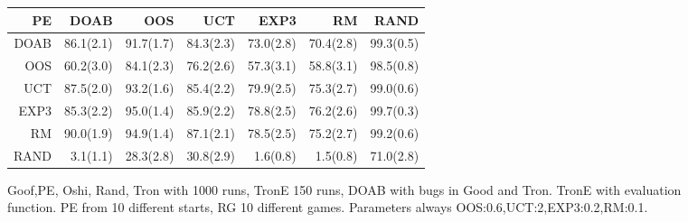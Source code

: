 \begin{figure}
\begin{footnotesize}

\begin{tabular}{|r|rrrrrr|}\hline
PE&DOAB&OOS&UCT&EXP3&RM&RAND\\\hline
DOAB&86.1(2.1)&91.7(1.7)&84.3(2.3)&73.0(2.8)&70.4(2.8)&99.3(0.5)\\
OOS&60.2(3.0)&84.1(2.3)&76.2(2.6)&57.3(3.1)&58.8(3.1)&98.5(0.8)\\
UCT&87.5(2.0)&93.2(1.6)&85.4(2.2)&79.9(2.5)&75.3(2.7)&99.0(0.6)\\
EXP3&85.3(2.2)&95.0(1.4)&85.9(2.2)&78.8(2.5)&76.2(2.6)&99.7(0.3)\\
RM&90.0(1.9)&94.9(1.4)&87.1(2.1)&78.5(2.5)&75.2(2.7)&99.2(0.6)\\
RAND&3.1(1.1)&28.3(2.8)&30.8(2.9)&1.6(0.8)&1.5(0.8)&71.0(2.8)\\
\hline
\end{tabular}


\end{footnotesize}
\caption{Goof,PE, Oshi, Rand, Tron with 1000 runs, TronE 150 runs, DOAB with bugs in Good and Tron. TronE with evaluation function. PE from 10 different starts, RG 10 different games. Parameters always OOS:0.6,UCT:2,EXP3:0.2,RM:0.1.}
\end{figure}

